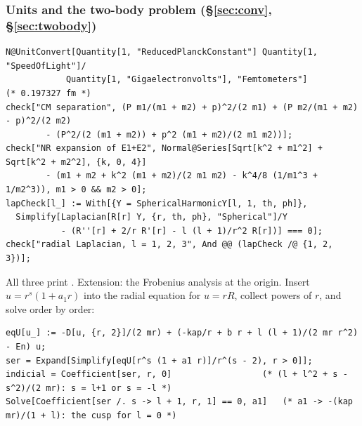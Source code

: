 \documentclass[11pt,a4paper]{article}
\numberwithin{equation}{section}
\theoremstyle{definition}
\theoremstyle{plain}
\theoremstyle{remark}
\numberwithin{algorithm}{section}
\begin{document}
\subsubsection{Units and the two-body problem (\S\ref{sec:conv}, \S\ref{sec:twobody})}
\begin{lstlisting}[style=wl]
N@UnitConvert[Quantity[1, "ReducedPlanckConstant"] Quantity[1, "SpeedOfLight"]/
            Quantity[1, "Gigaelectronvolts"], "Femtometers"]         (* 0.197327 fm *)
check["CM separation", (P m1/(m1 + m2) + p)^2/(2 m1) + (P m2/(m1 + m2) - p)^2/(2 m2)
        - (P^2/(2 (m1 + m2)) + p^2 (m1 + m2)/(2 m1 m2))];
check["NR expansion of E1+E2", Normal@Series[Sqrt[k^2 + m1^2] + Sqrt[k^2 + m2^2], {k, 0, 4}]
        - (m1 + m2 + k^2 (m1 + m2)/(2 m1 m2) - k^4/8 (1/m1^3 + 1/m2^3)), m1 > 0 && m2 > 0];
lapCheck[l_] := With[{Y = SphericalHarmonicY[l, 1, th, ph]},
  Simplify[Laplacian[R[r] Y, {r, th, ph}, "Spherical"]/Y
           - (R''[r] + 2/r R'[r] - l (l + 1)/r^2 R[r])] === 0];
check["radial Laplacian, l = 1, 2, 3", And @@ (lapCheck /@ {1, 2, 3})];
\end{lstlisting}
All three print . Extension: the Frobenius analysis at the origin. Insert $u=r^s(1+a_1r)$ into the radial equation for $u=rR$, collect powers of $r$, and solve order by order:
\begin{lstlisting}[style=wl]
eqU[u_] := -D[u, {r, 2}]/(2 mr) + (-kap/r + b r + l (l + 1)/(2 mr r^2) - En) u;
ser = Expand[Simplify[eqU[r^s (1 + a1 r)]/r^(s - 2), r > 0]];
indicial = Coefficient[ser, r, 0]                  (* (l + l^2 + s - s^2)/(2 mr): s = l+1 or s = -l *)
Solve[Coefficient[ser /. s -> l + 1, r, 1] == 0, a1]   (* a1 -> -(kap mr)/(1 + l): the cusp for l = 0 *)
\end{lstlisting}
\end{document}
